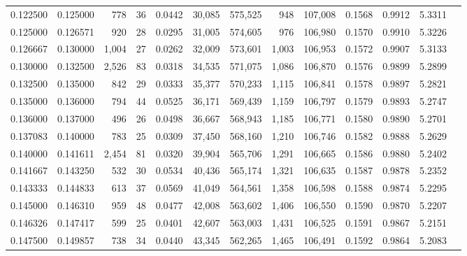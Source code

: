 \begin{tabular}{rrrrrrrrrrrrr}
0.122500 & 0.125000 &   778 &  36 &                                     0.0442 &  30,085 & 575,525 &     948 & 107,008 & 0.1568 & 0.9912 & 5.3311 \\
0.125000 & 0.126571 &   920 &  28 &                                     0.0295 &  31,005 & 574,605 &     976 & 106,980 & 0.1570 & 0.9910 & 5.3226 \\
0.126667 & 0.130000 & 1,004 &  27 &                                     0.0262 &  32,009 & 573,601 &   1,003 & 106,953 & 0.1572 & 0.9907 & 5.3133 \\
0.130000 & 0.132500 & 2,526 &  83 &                                     0.0318 &  34,535 & 571,075 &   1,086 & 106,870 & 0.1576 & 0.9899 & 5.2899 \\
0.132500 & 0.135000 &   842 &  29 &                                     0.0333 &  35,377 & 570,233 &   1,115 & 106,841 & 0.1578 & 0.9897 & 5.2821 \\
0.135000 & 0.136000 &   794 &  44 &                                     0.0525 &  36,171 & 569,439 &   1,159 & 106,797 & 0.1579 & 0.9893 & 5.2747 \\
0.136000 & 0.137000 &   496 &  26 &                                     0.0498 &  36,667 & 568,943 &   1,185 & 106,771 & 0.1580 & 0.9890 & 5.2701 \\
0.137083 & 0.140000 &   783 &  25 &                                     0.0309 &  37,450 & 568,160 &   1,210 & 106,746 & 0.1582 & 0.9888 & 5.2629 \\
0.140000 & 0.141611 & 2,454 &  81 &                                     0.0320 &  39,904 & 565,706 &   1,291 & 106,665 & 0.1586 & 0.9880 & 5.2402 \\
0.141667 & 0.143250 &   532 &  30 &                                     0.0534 &  40,436 & 565,174 &   1,321 & 106,635 & 0.1587 & 0.9878 & 5.2352 \\
0.143333 & 0.144833 &   613 &  37 &                                     0.0569 &  41,049 & 564,561 &   1,358 & 106,598 & 0.1588 & 0.9874 & 5.2295 \\
0.145000 & 0.146310 &   959 &  48 &                                     0.0477 &  42,008 & 563,602 &   1,406 & 106,550 & 0.1590 & 0.9870 & 5.2207 \\
0.146326 & 0.147417 &   599 &  25 &                                     0.0401 &  42,607 & 563,003 &   1,431 & 106,525 & 0.1591 & 0.9867 & 5.2151 \\
0.147500 & 0.149857 &   738 &  34 &                                     0.0440 &  43,345 & 562,265 &   1,465 & 106,491 & 0.1592 & 0.9864 & 5.2083 \\

\end{tabular}
